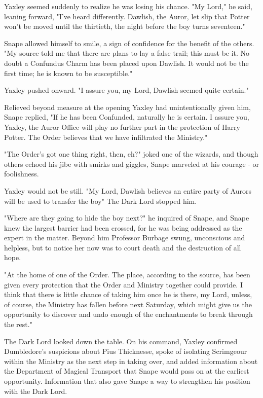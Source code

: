 Yaxley seemed suddenly to realize he was losing his chance. "My Lord," he said, leaning forward, "I've heard differently. Dawlish, the Auror, let slip that Potter won't be moved until the thirtieth, the night before the boy turns seventeen."

Snape allowed himself to smile, a sign of confidence for the benefit of the others. "My source told me that there are plans to lay a false trail; this must be it. No doubt a Confundus Charm has been placed upon Dawlish. It would not be the first time; he is known to be susceptible."

Yaxley pushed onward. "I assure you, my Lord, Dawlish seemed quite certain."

Relieved beyond measure at the opening Yaxley had unintentionally given him, Snape replied, "If he has been Confunded, naturally he is certain. I assure you, Yaxley, the Auror Office will play no further part in the protection of Harry Potter. The Order believes that we have infiltrated the Ministry."

"The Order's got one thing right, then, eh?" joked one of the wizards, and though others echoed his jibe with smirks and giggles, Snape marveled at his courage - or foolishness.

Yaxley would not be still. "My Lord, Dawlish believes an entire party of Aurors will be used to transfer the boy{\el}" The Dark Lord stopped him.

"Where are they going to hide the boy next?" he inquired of Snape, and Snape knew the largest barrier had been crossed, for he was being addressed as the expert in the matter. Beyond him Professor Burbage swung, unconscious and helpless, but to notice her now was to court death and the destruction of all hope.

"At the home of one of the Order. The place, according to the source, has been given every protection that the Order and Ministry together could provide. I think that there is little chance of taking him once he is there, my Lord, unless, of course, the Ministry has fallen before next Saturday, which might give us the opportunity to discover and undo enough of the enchantments to break through the rest."

The Dark Lord looked down the table. On his command, Yaxley confirmed Dumbledore's suspicions about Pius Thicknesse, spoke of isolating Scrimgeour within the Ministry as the next step in taking over, and added information about the Department of Magical Transport that Snape would pass on at the earliest opportunity. Information that also gave Snape a way to strengthen his position with the Dark Lord.

